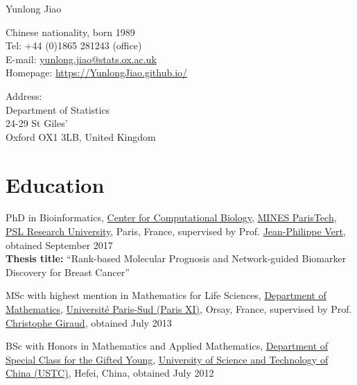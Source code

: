 \documentclass[10pt,a4paper]{article}
\def\name{Yunlong Jiao}
\renewenvironment{itemize}{
  \begin{list}{}{
    \setlength{\leftmargin}{1.2em}
  }
}{
  \end{list}
}
\begin{document}
{\huge \name}


\vspace{0.15in}

\begin{minipage}[t]{0.5\textwidth}
  Chinese nationality, born 1989 \\
  Tel: +44 (0)1865 281243 (office) \\
  E-mail: \href{mailto:yunlong.jiao@stats.ox.ac.uk}{yunlong.jiao@stats.ox.ac.uk} \\
  Homepage: \href{https://YunlongJiao.github.io/}{https://YunlongJiao.github.io/}
\end{minipage}
\begin{minipage}[t]{0.45\textwidth}
  Address: \\
  	Department of Statistics\\
  	24-29 St Giles'\\
  	Oxford OX1 3LB, United Kingdom
\end{minipage}

\section*{Education}

\begin{itemize}
\item PhD in Bioinformatics, \href{http://cbio.ensmp.fr/}{Center for Computational Biology}, \href{http://www.ensmp.fr/}{MINES ParisTech}, \href{https://www.univ-psl.fr/}{PSL Research University}, Paris, France, supervised by Prof. \href{http://cbio.ensmp.fr/~jvert/}{Jean-Philippe Vert}, obtained September 2017\\
\textbf{Thesis title:} ``Rank-based Molecular Prognosis and Network-guided Biomarker Discovery for Breast Cancer''
\item MSc with highest mention in Mathematics for Life Sciences, \href{https://www.math.u-psud.fr/}{Department of Mathematics}, \href{http://www.u-psud.fr/}{Universit\'{e} Paris-Sud (Paris XI)}, Orsay, France, supervised by Prof. \href{http://www.cmap.polytechnique.fr/~giraud/}{Christophe Giraud}, obtained July 2013
\item BSc with Honors in Mathematics and Applied Mathematics, \href{http://scgy.ustc.edu.cn/}{Department of Special Class for the Gifted Young}, \href{http://www.ustc.edu.cn/}{University of Science and Technology of China (USTC)}, Hefei, China, obtained July 2012
\end{itemize}
\end{document}
